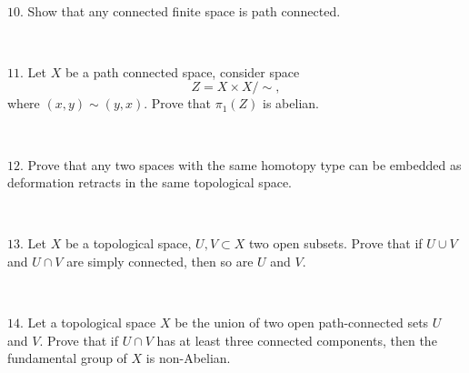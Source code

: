\documentclass{article}
\def\noi{\noindent}%
\begin{document}
\ 

\noi $10.$ Show that any connected finite space is path connected.

\ 

\noi $11.$ Let $X$ be a path connected space, consider space 
$$Z=X\times X/\sim,$$
where $(x,y)\sim(y,x)$.
Prove that $\pi_1(Z)$ is abelian.

\ 

\noi $12.$ Prove that any two spaces with the same homotopy type 
can be embedded as
deformation retracts in the same topological space.

\ 

\noi $13.$ Let $X$ be a topological space, $U, V \subset  X$ two open subsets. 
Prove that if
$U \cup V$ and $U \cap V$ are simply connected, then so are $U$ and $V$.

\ 

\noi $14.$ Let a topological space $X$ be the union of two open path-connected
sets $U$ and $V$. 
Prove that if $U\cap V$ has at least three connected components,
then the fundamental group of $X$ is non-Abelian.
\end{document}
